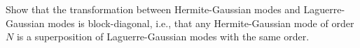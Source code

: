 %

\begin{exercicio}
Show that the transformation between Hermite-Gaussian modes and Laguerre-Gaussian modes is block-diagonal, i.e., that any Hermite-Gaussian mode of order $N$ is a superposition of Laguerre-Gaussian modes with the same order.
\end{exercicio}


